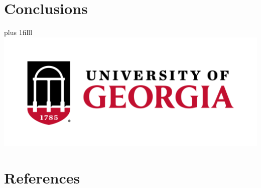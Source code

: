 \documentclass{beamer}\usepackage[]{graphicx}\usepackage[]{xcolor}
\newcommand{\Logo}{{\hskip0pt plus 1filll \includegraphics[scale=0.028]{uga_logo.png}}}
\begin{document}
  \section{Conclusions}

\begin{frame}{\Logo}
  
\end{frame}
  
  \section{References}
    \printbibliography
  
\end{document}
